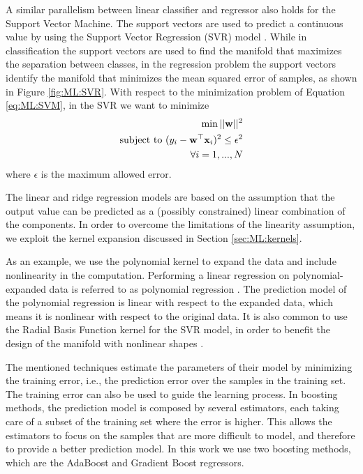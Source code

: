 A similar parallelism between linear classifier and regressor also holds for the Support Vector Machine. The support vectors are used to predict a continuous value by using the Support Vector Regression (SVR) model \cite{Rho2009}. While in classification the support vectors are used to find the manifold that maximizes the separation between classes, in the regression problem the support vectors identify the manifold that minimizes the mean squared error of samples, as shown in Figure \ref{fig:ML:SVR}. With respect to the minimization problem of Equation \ref{eq:ML:SVM}, in the SVR we want to minimize
\begin{equation}
\begin{split}
\min  ||\mathbf{w}||^2\\
\text{subject to  } (y_i-\mathbf{w}^\top \mathbf{x}_i)^2\leq \epsilon^2 \\
\forall i=1,...,N
\end{split}
\label{eq:ML:SVR}
\end{equation}
where $\epsilon$ is the maximum allowed error.

The linear and ridge regression models are based on the assumption that the output value can be predicted as a (possibly constrained) linear combination of the components. In order to overcome the limitations of the linearity assumption, we exploit the kernel expansion discussed in Section \ref{sec:ML:kernels}.

As an example, we use the polynomial kernel to expand the data and include nonlinearity in the computation. Performing a linear regression on polynomial-expanded data is referred to as polynomial regression \cite{Sen1990}. The prediction model of the polynomial regression is linear with respect to the expanded data, which means it is nonlinear with respect to the original data. It is also common to use the Radial Basis Function kernel for the SVR model, in order to benefit the design of the manifold with nonlinear shapes \cite{Smola2004}. 

The mentioned techniques estimate the parameters of their model by minimizing the training error, i.e., the prediction error over the samples in the training set. The training error can also be used to guide the learning process. In boosting methods, the prediction model is composed by several estimators, each taking care of a subset of the training set where the error is higher. This allows the estimators to focus on the samples that are more difficult to model, and therefore to provide a better prediction model. In this work we use two boosting methods, which are the AdaBoost and Gradient Boost regressors. 

